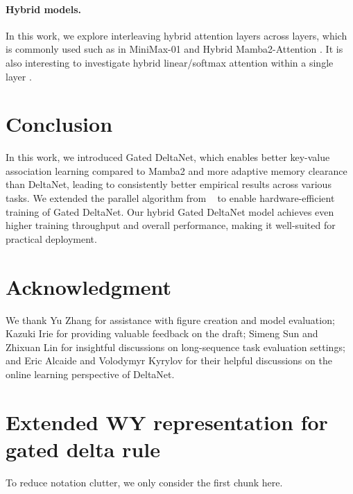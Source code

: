\documentclass{article}
\begin{document}
\paragraph{Hybrid models.} In this work, we explore interleaving hybrid attention layers across layers, which is commonly used such as in MiniMax-01 \citep{minimax2025minimax01scalingfoundationmodels} and Hybrid Mamba2-Attention \citep{waleffe2024empiricalstudymambabasedlanguage}. It is also interesting to investigate hybrid linear/softmax attention within a single layer \citep{GAU,zancato2024bmojo,munkhdalai2024leave,nunez2024expansionspancombiningfading,dong2025hymba,zhang2025lolcats}. 

\section{Conclusion}
In this work, we introduced Gated DeltaNet, which enables better key-value association learning compared to Mamba2 and more adaptive memory clearance than DeltaNet, leading to consistently better empirical results across various tasks. We extended the parallel algorithm from ~\cite{yang2024parallelizing} to enable hardware-efficient training of Gated DeltaNet. Our hybrid Gated DeltaNet model achieves even higher training throughput and overall performance, making it well-suited for practical deployment.

\section*{Acknowledgment}
We thank Yu Zhang for assistance with figure creation and model evaluation; Kazuki Irie for providing valuable feedback on the draft; Simeng Sun and Zhixuan Lin for insightful discussions on long-sequence task evaluation settings; and Eric Alcaide and Volodymyr Kyrylov for their helpful discussions on the online learning perspective of DeltaNet.



\newpage
\appendix

\renewcommand{\thesection}{\Alph{section}}
\renewcommand\thefigure{S.\arabic{figure}}
\setcounter{figure}{0}
\renewcommand\thetable{S.\arabic{table}}
\setcounter{table}{0}

\section{Extended WY representation for gated delta rule}
\label{sec:extended_wy_proof}
To reduce notation clutter, we only consider the first chunk here. 
\end{document}
